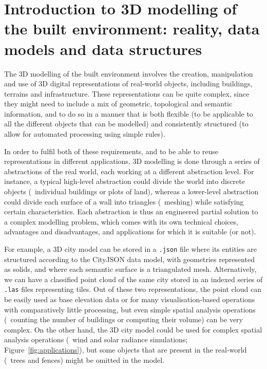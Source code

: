 
\setchapterpreamble[u]{\margintoc}

\graphicspath{{dmds/}}

\chapter{Introduction to 3D modelling of the built environment: reality, data models and data structures}%
\label{chap:dmds}

The 3D modelling of the built environment involves the creation, manipulation and use of 3D digital representations of real-world objects, including buildings, terrains and infrastructure.
These representations can be quite complex, since they might need to include a mix of geometric, topological and semantic information, and to do so in a manner that is both flexible (to be applicable to all the different objects that can be modelled) and consistently structured (to allow for automated processing using simple rules).

In order to fulfil both of these requirements, and to be able to reuse representations in different applications, 3D modelling is done through a series of abstractions of the real world, each working at a different abstraction level.
For instance, a typical high-level abstraction could divide the world into discrete objects (\eg\ individual buildings or plots of land), whereas a lower-level abstraction could divide each surface of a wall into triangles (\ie\ meshing) while satisfying certain characteristics.
Each abstraction is thus an engineered partial solution to a complex modelling problem, which comes with its own technical choices, advantages and disadvantages, and applications for which it is suitable (or not).

For example, a 3D city model can be stored in a \texttt{.json} file where its entities are structured according to the CityJSON data model, with geometries represented as solids, and where each semantic surface is a triangulated mesh.
Alternatively, we can have a classified point cloud of the same city stored in an indexed series of \texttt{.las} files representing tiles.
Out of these two representations, the point cloud can be easily used as base elevation data or for many visualisation-based operations with comparatively little processing, but even simple spatial analysis operations (\eg\ counting the number of buildings or computing their volume) can be very complex.
On the other hand, the 3D city model could be used for complex spatial analysis operations (\eg\ wind and solar radiance simulations; Figure~\ref{fig:applications}), but some objects that are present in the real-world (\eg\ trees and fences) might be omitted in the model.

